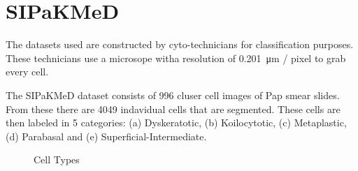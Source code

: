 \documentclass[ms,electronic,oneside,twosidetoc,letterpaper,chaptercenter,parttop]{byumsphd}
\begin{document}
\section{SIPaKMeD}
The datasets used are constructed by cyto-technicians for classification purposes. These technicians use a microsope witha resolution of  \SI{0.201}{\micro\metre} / pixel to grab every cell.

The SIPaKMeD dataset consists of 996 cluser cell images of Pap smear slides. From these there are
4049 indavidual cells that are segmented. These cells are then labeled in 5 categories: 
(a) Dyskeratotic, (b) Koilocytotic, (c) Metaplastic, (d) Parabasal and (e) Superficial-Intermediate.

\begin{figure}[H]
  \centering
   \quad
   \quad
  \hfill
   \quad
  \caption{Cell Types}
\end{figure}
\end{document}
